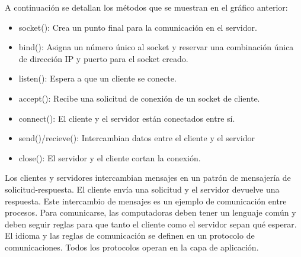 A continuación se detallan los métodos que se muestran en el gráfico anterior:
\begin{itemize}
    \item socket(): Crea un punto final para la comunicación en el servidor.
    \item bind(): Asigna un número único al socket y reservar una combinación única de dirección IP y puerto para el socket creado.
    \item listen(): Espera a que un cliente se conecte.
    \item accept(): Recibe una solicitud de conexión de un socket de cliente.
    \item connect(): El cliente y el servidor están conectados entre sí.
    \item send()/recieve(): Intercambian datos entre el cliente y el servidor
    \item close(): El servidor y el cliente cortan la conexión.
\end{itemize}




Los clientes y servidores intercambian mensajes en un patrón de mensajería de solicitud-respuesta. El cliente envía una solicitud y el servidor devuelve una respuesta. Este intercambio de mensajes es un ejemplo de comunicación entre procesos. Para comunicarse, las computadoras deben tener un lenguaje común y deben seguir reglas para que tanto el cliente como el servidor sepan qué esperar. El idioma y las reglas de comunicación se definen en un protocolo de comunicaciones. Todos los protocolos operan en la capa de aplicación.\\

